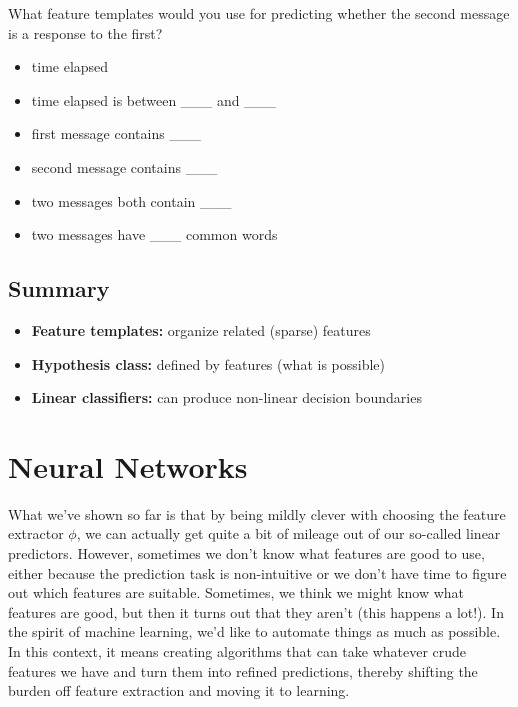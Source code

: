 \begin{example}	
 What feature templates would you use for predicting whether the second message is a response to the first?
\begin{itemize}
	\item time elapsed
	\item time elapsed is between \_\_\_ and \_\_\_
	\item first message contains \_\_\_
	\item second message contains \_\_\_
	\item two messages both contain \_\_\_
	\item two messages have \_\_\_ common words
\end{itemize}
\end{example}

\subsection{Summary} %
\label{sub:summary}

\begin{itemize}
  \item \textbf{Feature templates:} organize related (sparse) features
  \item \textbf{Hypothesis class:} defined by features (what is possible)
  \item \textbf{Linear classifiers:} can produce non-linear decision boundaries
\end{itemize}



\section{Neural Networks} %
\label{sec:neural_networks}

What we've shown so far is that by being mildly clever with choosing the feature extractor $\phi$,
we can actually get quite a bit of mileage out of our so-called linear predictors.
% 
However, sometimes we don't know what features are good to use, either because the prediction task is non-intuitive
or we don't have time to figure out which features are suitable.
Sometimes, we think we might know what features are good, but then it turns out that they aren't (this happens a lot!).
% 
In the spirit of machine learning,
we'd like to automate things as much as possible.
In this context, it means creating algorithms that can take whatever crude features we have and turn them into refined predictions,
thereby shifting the burden off feature extraction and moving it to learning.

